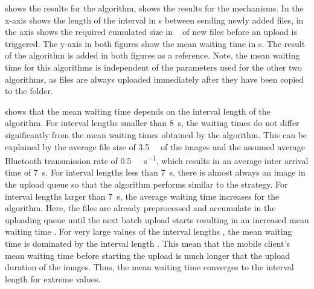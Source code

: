  shows the results for the \algointerval algorithm,  shows the results for the \algosize mechanisms. 
In  the x-axis shows the length of the interval \thresholdInterval in \si{\second} between sending newly added files, in  the axis shows the required cumulated size in \si{\mega\byte} of new files before an upload is triggered.
The y-axis in both figures show the mean waiting time \sojournTime in \si{\second}.
The result of the \algoimmediate algorithm is added in both figures as a reference.
Note, the mean waiting time \sojournTime for this algorithms is independent of the parameters used for the other two algorithms, as files are always uploaded immediately after they have been copied to the \dropbox folder.

 shows that the mean waiting time \sojournTime depends on the interval length \thresholdInterval of the \algointerval algorithm. 
For interval lengths \thresholdInterval smaller than \SI{8}{\second}, the waiting times do not differ significantly from the mean waiting times \sojournTime obtained by the \algoimmediate algorithm.
This can be explained by the average file size of \SI{3.5}{\mega\byte} of the images and the assumed average Bluetooth transmission rate of \SI{0.5}{\mega\bit\per\second}, which results in an average inter arrival time of \SI{7}{\second}.
For interval lengths \thresholdInterval less than \SI{7}{\second}, there is almost always an image in the upload queue so that the algorithm performs similar to the \algoimmediate strategy. 
For interval lengths \thresholdInterval larger than \SI{7}{\second}, the average waiting time increases for the \algointerval algorithm.
Here, the files are already preprocessed and accumulate in the uploading queue until the next batch upload starts resulting in an increased mean waiting time \sojournTime.
For very large values of the interval lengths \thresholdInterval, the mean waiting time \sojournTime is dominated by the interval length \thresholdInterval.
This mean that the mobile client's mean waiting time \sojournTime before starting the upload is much longer that the upload duration of the images.
Thus, the mean waiting time \sojournTime converges to the interval length \thresholdInterval for extreme values.

